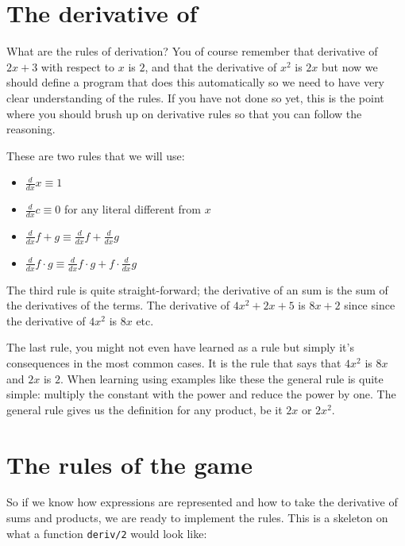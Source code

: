 \documentclass[a4paper,11pt]{article}
\begin{document}
\section{The derivative of}

What are the rules of derivation? You of course remember that derivative
of $2x + 3$ with respect to $x$ is $2$, and that the derivative of
$x^2$ is $2x$ but now we should define a program that does this
automatically so we need to have very clear understanding of the
rules. If you have not done so yet, this is the point where you should
brush up on derivative rules so that you can follow the reasoning.

These are two rules that we will use:

\begin{itemize}
\item $\frac{d}{dx} x \equiv 1$
\item $\frac{d}{dx} c \equiv 0$  for any literal different from $x$
\item $\frac{d}{dx} f + g \equiv  \frac{d}{dx} f + \frac{d}{dx} g$
\item $\frac{d}{dx} f \cdot  g \equiv  \frac{d}{dx} f \cdot  g + f \cdot \frac{d}{dx} g$
\end{itemize}

\noindent The third rule is quite straight-forward; the derivative of an sum is
the sum of the derivatives of the terms. The derivative of
$4x^{2} + 2x + 5$ is $8x + 2$ since since the derivative of $4x^{2}$
is $8x$ etc.

The last rule, you might not even have learned as a rule but simply
it's consequences in the most common cases. It is the rule that says that
$4x^{2}$ is $8x$ and $2x$ is $2$. When learning using examples like these
the general rule is quite simple: multiply the constant with the power
and reduce the power by one. The general rule gives us the definition
for any product, be it $2x$ or $2x^{2}$.



\section{The rules of the game}

So if we know how expressions are represented and how to take the
derivative of sums and products, we are ready to implement the
rules. This is a skeleton on what a function {\tt deriv/2} would look like:
\end{document}
